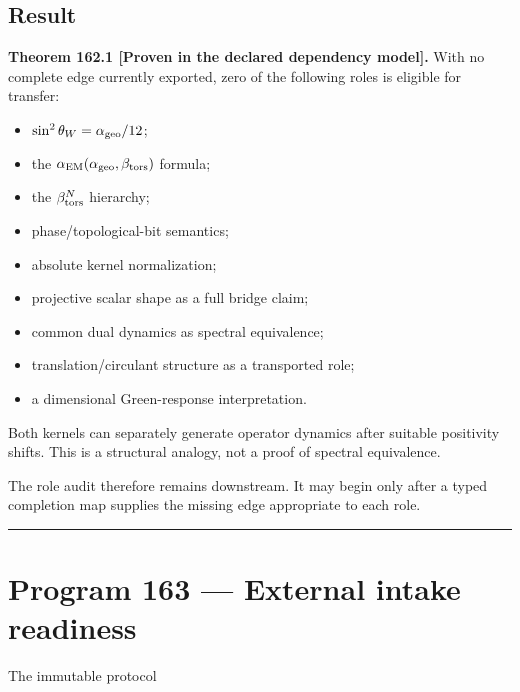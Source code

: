 \documentclass[11pt,a4paper,openany]{report}
\begin{document}
\section{Result}

\textbf{Theorem 162.1 [Proven in the declared dependency model].} With no complete edge currently exported, zero of the following roles is eligible for transfer:

\begin{itemize}
\item 
\(\sin^2\theta_W=\alpha_{\rm geo}/12\);

\item 
the \(\alpha_{\rm EM}(\alpha_{\rm geo},\beta_{\rm tors})\) formula;

\item 
the \(\beta_{\rm tors}^N\) hierarchy;

\item 
phase/\allowbreak{}topological-bit semantics;

\item 
absolute kernel normalization;

\item 
projective scalar shape as a full bridge claim;

\item 
common dual dynamics as spectral equivalence;

\item 
translation/\allowbreak{}circulant structure as a transported role;

\item 
a dimensional Green-response interpretation.

\end{itemize}

Both kernels can separately generate operator dynamics after suitable positivity shifts. This is a structural analogy, not a proof of spectral equivalence.

The role audit therefore remains downstream. It may begin only after a typed completion map supplies the missing edge appropriate to each role.

\par\medskip\hrule\medskip

\chapter{Program 163 --- External intake readiness}

The immutable protocol
\end{document}
